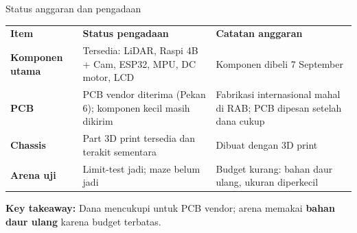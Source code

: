 \documentclass[aspectratio=169,10pt,t]{beamer}
\gdef\currnum{00}
\gdef\currlabel{}
\newcommand{\sect}[2]{\gdef\currnum{#1}\gdef\currlabel{#2}}
\newcommand{\takeawayc}[1]{%
    \par\vspace{6pt}\begin{dpanel}\small\textbf{\color{rblue}Key takeaway:} #1\end{dpanel}}
\newcommand{\hl}[1]{{\setlength{\fboxsep}{1.2pt}\colorbox{ryel}{\bfseries\color{rblue}#1}}}
\newcommand{\hd}[1]{\bfseries\color{white}#1}
\newcommand{\tablestyle}{\small\setlength{\tabcolsep}{6pt}\setlength{\extrarowheight}{3pt}\arrayrulecolor{rule}}
\begin{document}
    \sect{06}{Hasil sementara}
    \begin{frame}{Status anggaran dan pengadaan}
        \tablestyle
        \renewcommand{\arraystretch}{1.0}
        \begin{tabularx}{\textwidth}{L{3.6cm} Y Y}
    \hd{Item}&\hd{Status pengadaan}&\hd{Catatan anggaran}\\
    \textbf{\color{rblue}Komponen utama}&Tersedia: LiDAR, Raspi 4B + Cam, ESP32, MPU, DC motor, LCD&Komponen dibeli 7 September\\
    \textbf{\color{rblue}PCB}&PCB vendor diterima (Pekan 6); komponen kecil masih dikirim&Fabrikasi internasional mahal di RAB; PCB dipesan setelah dana cukup\\
    \textbf{\color{rblue}Chassis}&Part 3D print tersedia dan terakit sementara&Dibuat dengan 3D print\\
    \textbf{\color{rblue}Arena uji}&Limit-test jadi; maze belum jadi&Budget kurang: bahan daur ulang, ukuran diperkecil\\
    \hline
        \end{tabularx}
        \takeawayc{Dana mencukupi untuk PCB vendor; arena memakai \hl{bahan daur ulang} karena budget terbatas.}
    \end{frame}
\end{document}
